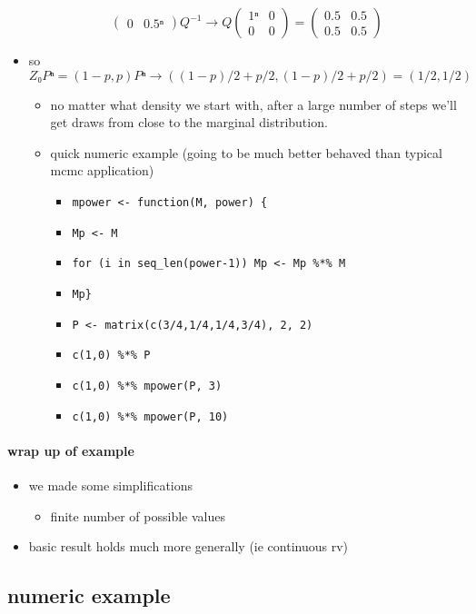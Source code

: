 \begin{itemize}
\[\begin{pmatrix}
    0 & 0.5ⁿ \end{pmatrix} Q^{-1} → Q \begin{pmatrix} 1ⁿ & 0 \\ 0 &
    0 \end{pmatrix} = \begin{pmatrix} 0.5 & 0.5 \\ 0.5 &
    0.5 \end{pmatrix}\]
\item so $Z₀ Pⁿ = (1-p, p) Pⁿ → ((1-p)/2 + p/2, (1-p)/2 + p/2) =
  (1/2, 1/2)$
\begin{itemize}
\item no matter what density we start with, after a large number
          of steps we'll get draws from close to the marginal
          distribution.
\item quick numeric example (going to be much better behaved than
          typical mcmc application)
\begin{itemize}
\item \texttt{mpower <- function(M, power) \{}
\item \texttt{Mp <- M}
\item \texttt{for (i in seq\_len(power-1)) Mp <- Mp \%*\% M}
\item \texttt{Mp\}}
\item \texttt{P <- matrix(c(3/4,1/4,1/4,3/4), 2, 2)}
\item \texttt{c(1,0) \%*\% P}
\item \texttt{c(1,0) \%*\% mpower(P, 3)}
\item \texttt{c(1,0) \%*\% mpower(P, 10)}
\end{itemize}
\end{itemize}
\end{itemize}

\paragraph{wrap up of example}
\begin{itemize}
\item we made some simplifications
\begin{itemize}
\item finite number of possible values
\end{itemize}
\item basic result holds much more generally (ie continuous rv)
\end{itemize}

\subsection{numeric example}

